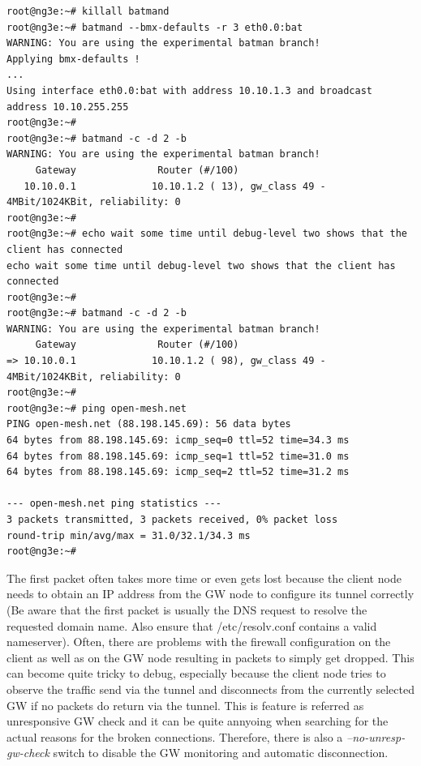 \documentclass[11pt]{article}
\begin{document}
\begin{enumerate}
\begin{small} \begin{verbatim}
root@ng3e:~# killall batmand
root@ng3e:~# batmand --bmx-defaults -r 3 eth0.0:bat
WARNING: You are using the experimental batman branch!
Applying bmx-defaults !
...
Using interface eth0.0:bat with address 10.10.1.3 and broadcast address 10.10.255.255
root@ng3e:~#
root@ng3e:~# batmand -c -d 2 -b
WARNING: You are using the experimental batman branch!
     Gateway              Router (#/100)
   10.10.0.1             10.10.1.2 ( 13), gw_class 49 - 4MBit/1024KBit, reliability: 0
root@ng3e:~#
root@ng3e:~# echo wait some time until debug-level two shows that the client has connected
echo wait some time until debug-level two shows that the client has connected
root@ng3e:~#
root@ng3e:~# batmand -c -d 2 -b
WARNING: You are using the experimental batman branch!
     Gateway              Router (#/100)
=> 10.10.0.1             10.10.1.2 ( 98), gw_class 49 - 4MBit/1024KBit, reliability: 0
root@ng3e:~#
root@ng3e:~# ping open-mesh.net
PING open-mesh.net (88.198.145.69): 56 data bytes
64 bytes from 88.198.145.69: icmp_seq=0 ttl=52 time=34.3 ms
64 bytes from 88.198.145.69: icmp_seq=1 ttl=52 time=31.0 ms
64 bytes from 88.198.145.69: icmp_seq=2 ttl=52 time=31.2 ms

--- open-mesh.net ping statistics ---
3 packets transmitted, 3 packets received, 0% packet loss
round-trip min/avg/max = 31.0/32.1/34.3 ms
root@ng3e:~#
\end{verbatim} \end{small}

The first packet often takes more time or even gets lost because the client node needs to obtain an IP address from the GW node to configure its tunnel correctly (Be aware that the first packet is usually the DNS request to resolve the requested domain name. Also ensure that /etc/resolv.conf contains a valid nameserver).
Often, there are problems with the firewall configuration on the client as well as on the GW node resulting in packets to simply get dropped.
%
This can become quite tricky to debug, especially because the client node tries to observe the traffic send via the tunnel and disconnects from the currently selected GW if no packets do return via the tunnel. This is feature is referred as unresponsive GW check and it can be quite annyoing when searching for the actual reasons for the broken connections. Therefore, there is also a \emph{--no-unresp-gw-check} switch to disable the GW monitoring and automatic disconnection.


\end{enumerate}
\end{document}

